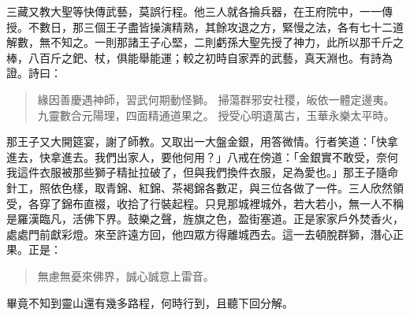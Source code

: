 三藏又教大聖等快傳武藝，莫誤行程。他三人就各掄兵器，在王府院中，一一傳授。不數日，那三個王子盡皆操演精熟，其餘攻退之方，緊慢之法，各有七十二道解數，無不知之。一則那諸王子心堅，二則虧孫大聖先授了神力，此所以那千斤之棒，八百斤之鈀、杖，俱能舉能運；較之初時自家弄的武藝，真天淵也。有詩為證。詩曰：
\begin{quote}
緣因善慶遇神師，習武何期動怪獅。
掃蕩群邪安社稷，皈依一體定邊夷。
九靈數合元陽理，四面精通道果之。
授受心明遺萬古，玉華永樂太平時。
\end{quote}

那王子又大開筵宴，謝了師教。又取出一大盤金銀，用答微情。行者笑道：「快拿進去，快拿進去。我們出家人，要他何用？」八戒在傍道：「金銀實不敢受，奈何我這件衣服被那些獅子精扯拉破了，但與我們換件衣服，足為愛也。」那王子隨命針工，照依色樣，取青錦、紅錦、茶褐錦各數疋，與三位各做了一件。三人欣然領受，各穿了錦布直裰，收拾了行裝起程。只見那城裡城外，若大若小，無一人不稱是羅漢臨凡，活佛下界。鼓樂之聲，旌旗之色，盈街塞道。正是家家戶外焚香火，處處門前獻彩燈。來至許遠方回，他四眾方得離城西去。這一去頓脫群獅，潛心正果。正是：
\begin{quote}
無慮無憂來佛界，誠心誠意上雷音。
\end{quote}

畢竟不知到靈山還有幾多路程，何時行到，且聽下回分解。
